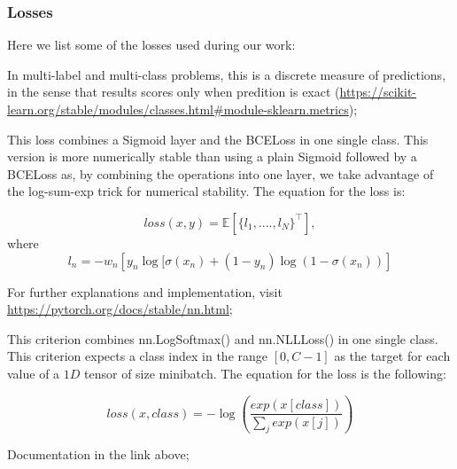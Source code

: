 \documentclass{article}
\begin{document}


\subsubsection{Losses}

Here we list some of the losses used during our work:

\begin{description}[align=left]

\item [Accuracy:] In multi-label and multi-class problems, this is a discrete measure of predictions, in the sense that results scores only when predition is exact (\url{https://scikit-learn.org/stable/modules/classes.html#module-sklearn.metrics});

\item [BCEWithLogitsLoss:] This loss combines a Sigmoid layer and the BCELoss in one single class. This version is more numerically stable than using a plain Sigmoid followed by a BCELoss as, by combining the operations into one layer, we take advantage of the log-sum-exp trick for numerical stability. The equation for the loss is:

\begin{equation}
loss(x,y) = \mathbb{E} \left[ \{ l_1,....,l_N\} ^\top \right] , 
\end{equation}
where
\begin{equation}
l_{n} = - w_{n} \left[ y_{n}  \log[\sigma(x_{n}) + (1-y_{n})  \log(1 - \sigma(x_{n})) \right]
\end{equation}


For further explanations and implementation, visit \url{https://pytorch.org/docs/stable/nn.html};

\item [CrossEntropyLoss:] This criterion combines nn.LogSoftmax() and nn.NLLLoss() in one single class. This criterion expects a class index in the range $[0,C-1]$ as the target for each value of a $1D$ tensor of size minibatch. The equation for the loss is the following:

\begin{equation}
loss(x,class) = - \log\left(\frac{exp(x[class])}{\sum_{j}{exp(x[j])}}\right)
\end{equation}

Documentation in the link above;

\item[LOSS DI KERAS]

\end{description}
\end{document}
